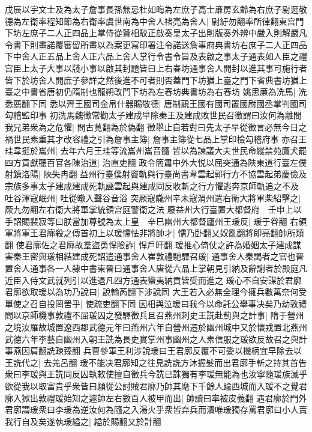 戊辰以宇文士及為太子詹事長孫無忌杜如晦為左庶子高士亷房玄齡為右庶子尉遲敬德為左衛率程知節為右衛率虞世南為中舍人禇亮為舍人|{
	尉紆勿翻率所律翻東宫門下坊左庶子二人正四品上掌侍從贊相駮正啟奏皇太子出則版奏外辨中嚴入則解嚴凡令書下則畫諾覆審留所畫以為案更寫印署注令諾送詹事府典書坊右庶子二人正四品下中舍人正五品上舍人正六品上舍人掌行令書令旨及表啟之事太子通表如人臣之禮宫臣上太子大事以牋小事以啟其封題皆曰上右春坊通事舍人開封以進其事可施行者皆下於坊舍人開庶子參詳之然後進不可者則否蓋門下坊猶上臺之門下省典書坊猶上臺之中書省唐初仍隋制也龍朔改門下坊為左春坊典書坊為右春坊}
姚思亷為洗馬|{
	洗悉薦翻下同}
悉以齊王國司金帛什器賜敬德|{
	唐制親王國有國司置國尉國丞掌判國司勾稽監印事}
初洗馬魏徵常勸太子建成早除秦王及建成敗世民召徵謂曰汝何為離間我兄弟衆為之危懼|{
	問古莧翻為於偽翻}
徵舉止自若對曰先太子早從徵言必無今日之禍世民素重其才改容禮之引為詹事主簿|{
	詹事主簿從七品上掌印檢勾稽府事}
亦召王珪韋挺於巂州|{
	去年六月王珪等流巂州巂音髓}
皆以為諫議大夫世民命縱禁苑鷹犬罷四方貢獻聽百官各陳治道|{
	治直吏翻}
政令簡肅中外大悦以屈突通為陜東道行臺左僕射鎮洛陽|{
	陜失冉翻}
益州行臺僕射竇軌與行臺尚書韋雲起郭行方不協雲起弟慶儉及宗族多事太子建成建成死軌誣雲起與建成同反收斬之行方懼逃奔京師軌追之不及　吐谷渾寇岷州|{
	吐從暾入聲谷音浴}
突厥寇隴州辛未寇渭州遣右衛大將軍柴紹擊之|{
	厥九勿翻左右衛大將軍掌統領宫庭警衛之法}
廢益州大行臺置大都督府　壬申上以手詔賜裴寂等曰朕當加尊號為太上皇　辛巳幽州大都督廬州王瑗反|{
	瑗于眷翻}
右領軍將軍王君廓殺之傳首初上以瑗懦怯非將帥才|{
	懦乃卧翻乂奴亂翻將即亮翻帥所類翻}
使君廓佐之君廓故羣盜勇悍險詐|{
	悍戶旰翻}
瑗推心倚仗之許為婚姻太子建成謀害秦王密與瑗相結建成死詔遣通事舍人崔敦禮馳驛召瑗|{
	通事舍人秦謁者之官也晉置舍人通事各一人隸中書東晉曰通事舍人唐從六品上掌朝見引納及辭謝者於殿庭凡近臣入侍文武就列引以進退凡四方通表蠻夷納貢皆受而進之}
瑗心不自安謀於君廓君廓欲取瑗以為功乃說曰|{
	說輸芮翻下涉說同}
大王若入必無全理今擁兵數萬奈何受單使之召自投罔罟乎|{
	使疏吏翻下同}
因相與泣瑗曰我今以命託公舉事决矣乃劫敦禮問以京師機事敦禮不屈瑗囚之發驛徵兵且召燕州刺史王詵赴薊與之計事|{
	隋于營州之境汝羅故城置遼西郡武德元年曰燕州六年自營州遷於幽州城中又於懷戎置北燕州武德六年李藝自幽州入朝王詵為長史實掌州事幽州之人素信服之瑗欲反故召之與計事燕因肩翻詵疎臻翻}
兵曹參軍王利涉說瑗曰王君廓反覆不可委以機柄宜早除去以王詵代之|{
	去羌呂翻}
瑗不能决君廓知之往見詵詵方沐握髮而出君廓手斬之持其首告衆曰李瑗與王詵同反囚執敕使擅自徵兵今詵已誅獨有李瑗無能為也汝寧隨瑗族滅乎欲從我以取富貴乎衆皆曰願從公討賊君廓乃帥其麾下千餘人踰西城而入瑗不之覺君廓入獄出敦禮瑗始知之遽帥左右數百人被甲而出|{
	帥讀曰率被皮義翻}
遇君廓於門外君廓謂瑗衆曰李瑗為逆汝何為隨之入湯火乎衆皆弃兵而潰唯瑗獨存罵君廓曰小人賣我行自及矣遂執瑗縊之|{
	縊於賜翻又於計翻}
